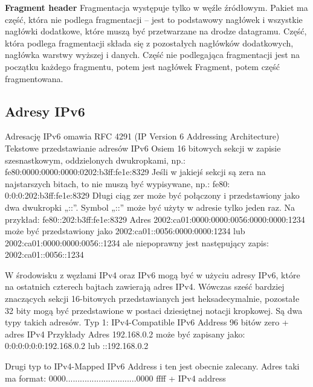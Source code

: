     \textbf{Fragment header}
    Fragmentacja występuje tylko w węźle źródłowym. Pakiet ma część, która nie podlega
    fragmentacji – jest to podstawowy nagłówek i wszystkie nagłówki dodatkowe, które muszą
    być przetwarzane na drodze datagramu. Część, która podlega fragmentacji składa się z
    pozostałych nagłówków dodatkowych, nagłówka warstwy wyższej i danych. Część nie
    podlegająca fragmentacji jest na początku każdego fragmentu, potem jest nagłówek
    Fragment, potem część fragmentowana.


    \subsection{Adresy IPv6}

    Adresację IPv6 omawia RFC 4291 (IP Version 6 Addressing Architecture)
    Tekstowe przedstawianie adresów IPv6
    Osiem 16 bitowych sekcji w zapisie szesnastkowym, oddzielonych dwukropkami, np.:
    fe80:0000:0000:0000:0202:b3ff:fe1e:8329
    Jeśli w jakiejś sekcji są zera na najstarszych bitach, to nie muszą być wypisywane, np.:
    fe80: 0:0:0:202:b3ff:fe1e:8329
    Długi ciąg zer może być połączony i przedstawiony jako dwa dwukropki „::”. Symbol „::”
    może być użyty w adresie tylko jeden raz.
    Na przykład:
    fe80::202:b3ff:fe1e:8329
    Adres
    2002:ca01:0000:0000:0056:0000:0000:1234
    może być przedstawiony jako
    2002:ca01::0056:0000:0000:1234
    lub
    2002:ca01:0000:0000:0056::1234
    ale niepoprawny jest następujący zapis:
    2002:ca01::0056::1234

    W środowisku z węzłami IPv4 oraz IPv6 mogą być w użyciu adresy IPv6, które na ostatnich
    czterech bajtach zawierają adres IPv4. Wówczas sześć bardziej znaczących sekcji 16-bitowych
    przedstawianych jest heksadecymalnie, pozostałe 32 bity mogą być przedstawione w postaci
    dziesiętnej notacji kropkowej.
    Są dwa typy takich adresów.
    Typ 1: IPv4-Compatible IPv6 Address
    96 bitów zero + adres IPv4
    Przykłady
    Adres 192.168.0.2 może być zapisany jako:
    0:0:0:0:0:0:192.168.0.2
    lub
    ::192.168.0.2

    Drugi typ to IPv4-Mapped IPv6 Address i ten jest obecnie zalecany.
    Adres taki ma format:
    0000..............................0000 ffff + IPv4 address



